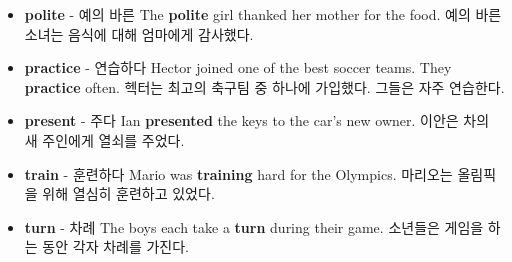 \documentclass{article}
\begin{document}
\begin{addmargin}[1em]{1em}
\begin{itemize}
        \item \fontsize{12pt}{14pt}\selectfont \textbf{polite} - 예의 바른 \newline
        The \textbf{polite} girl thanked her mother for the food. \newline
        예의 바른 소녀는 음식에 대해 엄마에게 감사했다.

        \item \fontsize{12pt}{14pt}\selectfont \textbf{practice} - 연습하다 \newline
        Hector joined one of the best soccer teams. They \textbf{practice} often. \newline
        헥터는 최고의 축구팀 중 하나에 가입했다. 그들은 자주 연습한다.

        \item \fontsize{12pt}{14pt}\selectfont \textbf{present} - 주다 \newline
        Ian \textbf{presented} the keys to the car's new owner. \newline
        이안은 차의 새 주인에게 열쇠를 주었다.

        \item \fontsize{12pt}{14pt}\selectfont \textbf{train} - 훈련하다 \newline
        Mario was \textbf{training} hard for the Olympics. \newline
        마리오는 올림픽을 위해 열심히 훈련하고 있었다.

        \item \fontsize{12pt}{14pt}\selectfont \textbf{turn} - 차례 \newline
        The boys each take a \textbf{turn} during their game. \newline
        소년들은 게임을 하는 동안 각자 차례를 가진다.
    \end{itemize}
\end{addmargin}

\newpage

\end{document}
